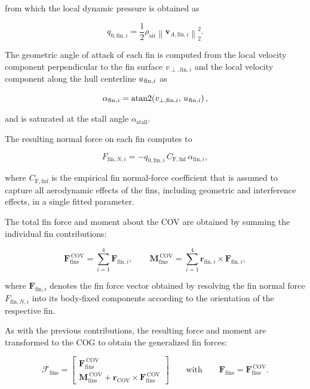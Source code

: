 from which the local dynamic pressure is obtained as

\begin{equation}
	q_{0, \mathrm{fin}, i} 
	= 
	\frac{1}{2}\rho_\text{air}\left\|\bm{v}_{A, \mathrm{fin}, i}\right\|_2^2.
\end{equation}

The geometric angle of attack of each fin is computed from the local velocity component perpendicular to the fin surface $v_{\perp, \mathrm{fin}, i}$ and the local velocity component along the hull centerline $u_{\mkern1mu \mathrm{fin}, i}$ as

\begin{equation}
	\alpha_{\mathrm{fin}, i} 
	= 
	\operatorname{atan2}\! \left( v_{\perp, \mathrm{fin}, i}, \, u_{\mkern1mu \mathrm{fin}, i} \right),
\end{equation}

and is saturated at the stall angle $\alpha_\text{stall}$.

The resulting normal force on each fin computes to

\begin{equation}
	F_{\mathrm{fin}, N, i} 
	= 
	-q_{0, \mathrm{fin}, i} \, C_\mathrm{F, fnf}\, \alpha_{\mathrm{fin}, i},
\end{equation}

where $C_\mathrm{F,fnf}$ is the empirical fin normal-force coefficient that is assumed to capture all aerodynamic effects of the fins, including geometric and interference effects, in a single fitted parameter.

The total fin force and moment about the COV are obtained by summing the individual fin contributions:

\begin{equation}
	\bm{F}_\mathrm{fins}^\mathrm{\, COV} 
	= 
	\sum_{i=1}^{4} \bm{F}_{\mathrm{fin}, i}, 
	\qquad
	\bm{M}_\mathrm{fins}^\mathrm{\, COV} 
	= 
	\sum_{i=1}^{4} \bm{r}_{\mathrm{fin}, i} \times \bm{F}_{\mathrm{fin}, i},
\end{equation}

where $\bm{F}_{\mathrm{fin}, i}$ denotes the fin force vector obtained by resolving the fin normal force $F_{\mathrm{fin}, N, i}$ into its body-fixed components according to the orientation of the respective fin.

As with the previous contributions, the resulting force and moment are transformed to the COG to obtain the generalized fin forces:

\begin{equation}
	\bm{\mathcal{F}}_\mathrm{fins}
	=
	\begin{bmatrix}
		\bm{F}_\mathrm{fins}^\mathrm{\, COV} \\
		\bm{M}_\mathrm{fins}^\mathrm{\, COV} + \bm{r}_\mathrm{COV} \times \bm{F}_\mathrm{fins}^\mathrm{\, COV}
	\end{bmatrix}
	\qquad
	\text{with}
	\qquad
	\bm{F}_\mathrm{fins}
	=
	\bm{F}_\mathrm{fins}^{\mathrm{\, COV}}.	
\end{equation}





